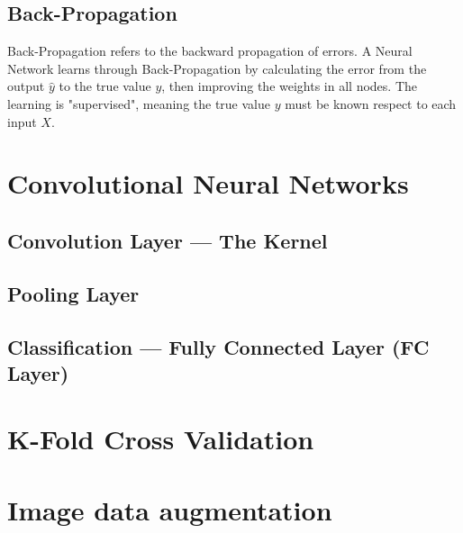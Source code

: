 \subsection{Back-Propagation}
Back-Propagation refers to the backward propagation of errors. A Neural Network learns through Back-Propagation by calculating the error from the output $\hat{y}$ to the true value $y$, then improving the weights in all nodes. The learning is "supervised", meaning the true value $y$ must be known respect to each input $X$.



\section{Convolutional Neural Networks}
\subsection{Convolution Layer — The Kernel}
\subsection{Pooling Layer}
\subsection{Classification — Fully Connected Layer (FC Layer)}
\section{K-Fold Cross Validation}
\section{Image data augmentation}



